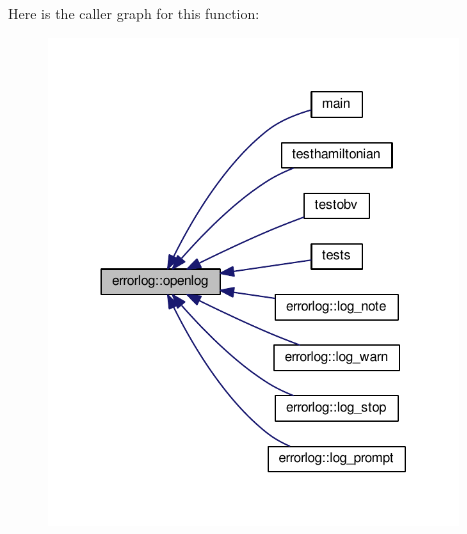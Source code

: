 Here is the caller graph for this function\+:\nopagebreak
\begin{figure}[H]
\begin{center}
\leavevmode
\includegraphics[width=308pt]{classerrorlog_a32bbf87dd265de25bd10ea31d95b751d_icgraph}
\end{center}
\end{figure}




